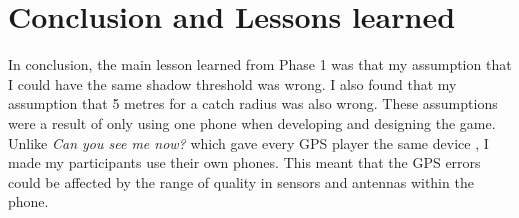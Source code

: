 \documentclass{l4proj}
\begin{document}
\begin{table}[]
    \centering
    \caption{At the start of the survey I gave my participants 4 statements and asked them whether they agreed or disagreed with it. This table shows the results of that survey}
    \label{tab:agree}
\end{table}

\section{Conclusion and Lessons learned}
In conclusion, the main lesson learned from Phase 1 was that my assumption that I could have the same
shadow threshold was wrong. I also found that my assumption that 5 metres for a catch radius was 
also wrong. These assumptions were a result of only using one phone when developing and designing
the game. Unlike \emph{Can you see me now?} which gave every GPS player the same device \citep{canyouseeme},
I made my participants use their own phones. This meant that the GPS errors could be affected by the
range of quality in sensors and antennas within the phone. 
\end{document}
